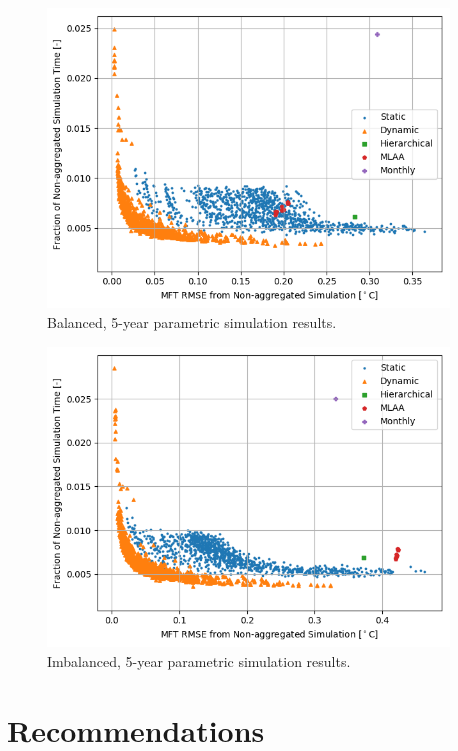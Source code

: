 \documentclass[review,12pt]{elsarticle}
\begin{document}
\begin{figure}[htbp!]
\centering
\includegraphics[width=0.95\textwidth]{balanced_5_fraction.png}
\caption{Balanced, 5-year parametric simulation results.}
\label{fig:b5}
\end{figure}

\begin{figure}[htbp!]
\centering
\includegraphics[width=0.95\textwidth]{imbalanced_5_fraction.png}
\caption{Imbalanced, 5-year parametric simulation results.}
\label{fig:i5}
\end{figure}

\section*{Recommendations}
\end{document}
